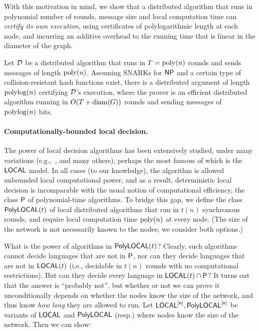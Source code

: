 	With this motivation in mind, we show that a distributed algorithm that runs in polynomial number of rounds, message size
	and local computation time can \emph{certify its own execution}, using certificates of polylogarithmic length
	at each node, and incurring an additive overhead to the running time that 
	is linear in the diameter of the graph.
	

\begin{theorem}[Informal]
    Let $\mathcal{D}$ be a distributed algorithm that runs in $T = \operatorname{poly}(n)$ rounds
    and sends messages of length $\operatorname{poly}(n)$.
    Assuming SNARKs for ${\mathsf{NP}}$ %
    and %
    a certain type of collision-resistant hash functions exist,
    there is a distributed argument of length $\operatorname{polylog}(n)$
    certifying $\mathcal{D}$'s execution, where the prover is an efficient distributed algorithm
    running in $O(T + \operatorname{diam}(G))$ rounds and sending messages of $\operatorname{polylog}(n)$ bits.
    \label{thm:distprover_informal}
\end{theorem}

\paragraph{Computationally-bounded local decision.}
The power of local decision algorithms has been extensively studied, under many variations (e.g.,~\cite{NS95,fraigniaud2013can,fraigniaud2013towards}, and many others),
perhaps the most famous of which is the ${\mathsf{LOCAL}}$ model.
In all cases (to our knowledge), the algorithm is allowed unbounded local computational power, and as a result,
deterministic local decision is incomparable with the usual notion of computational efficiency, the class ${\mathsf{P}}$
of polynomial-time algorithms.
To bridge this gap, we define the class $\mathsf{PolyLOCAL}(t)$ of local distributed algorithms that run in 
$t(n)$ synchronous rounds, and require local computation time $\operatorname{poly}(n)$ at every node.
(The size of the network is not necessarily known to the nodes;
we consider both options.)

What is the power of algorithms in $\mathsf{PolyLOCAL}(t)$?
Clearly, such algorithms cannot decide languages that are not in ${\mathsf{P}}$, nor can they decide languages 
that are not in ${\mathsf{LOCAL}}(t)$ (i.e., decidable in $t(n)$ rounds with no computational restrictions).
But can they decide every language in ${\mathsf{LOCAL}}(t) \cap {\mathsf{P}}$?
It turns out that the answer is ``probably not'', 
but whether or not we can prove it unconditionally depends on whether the nodes know the size of the network,
and thus know \emph{how long} they are allowed to run.
Let ${\mathsf{LOCAL}}^{[\mathsf{n}]}, \mathsf{PolyLOCAL}^{[\mathsf{n}]}$ be variants of ${\mathsf{LOCAL}}$ and $\mathsf{PolyLOCAL}$ (resp.) where nodes know the size of the network.
Then we can show:

